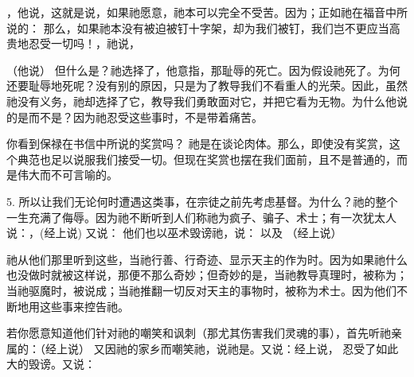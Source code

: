 ，他说，这就是说，如果祂愿意，祂本可以完全不受苦。因为；正如祂在福音中所说的： 那么，如果祂本没有被迫被钉十字架，却为我们被钉，我们岂不更应当高贵地忍受一切吗！，祂说，\par

（他说） 但什么是？祂选择了，他意指，那耻辱的死亡。因为假设祂死了。为何还要耻辱地死呢？没有别的原因，只是为了教导我们不看重人的光荣。因此，虽然祂没有义务，祂却选择了它，教导我们勇敢面对它，并把它看为无物。为什么他说的是而不是？因为祂忍受这些事时，不是带着痛苦。\par

你看到保禄在书信中所说的奖赏吗？ 祂是在谈论肉体。那么，即使没有奖赏，这个典范也足以说服我们接受一切。但现在奖赏也摆在我们面前，且不是普通的，而是伟大而不可言喻的。\par

5. 所以让我们无论何时遭遇这类事，在宗徒之前先考虑基督。为什么？祂的整个一生充满了侮辱。因为祂不断听到人们称祂为疯子、骗子、术士；有一次犹太人说：，(经上说) 又说： 他们也以巫术毁谤祂，说： 以及 （经上说）\par

祂从他们那里听到这些，当祂行善、行奇迹、显示天主的作为时。因为如果祂什么也没做时就被这样说，那便不那么奇妙；但奇妙的是，当祂教导真理时，被称为；当祂驱魔时，被说成；当祂推翻一切反对天主的事物时，被称为术士。因为他们不断地用这些事来控告祂。\par

若你愿意知道他们针对祂的嘲笑和讽刺（那尤其伤害我们灵魂的事），首先听祂亲属的：（经上说） 又因祂的家乡而嘲笑祂，说祂是。又说：经上说， 忍受了如此大的毁谤。又说：\par


